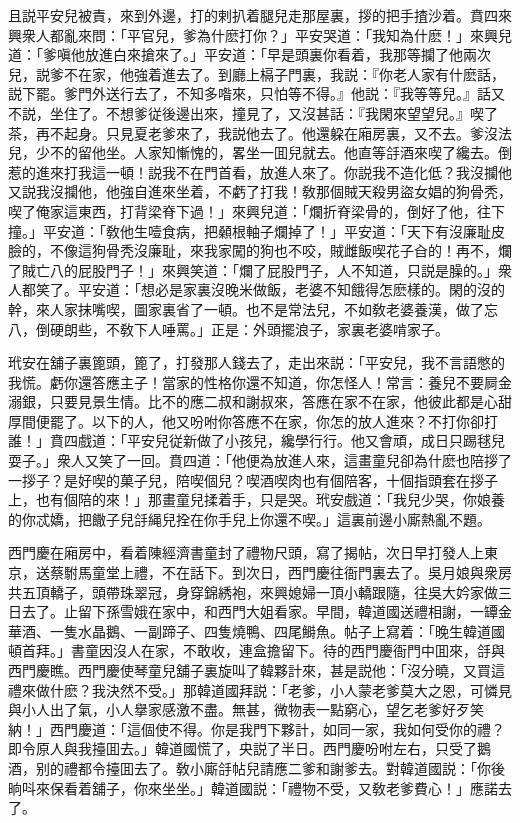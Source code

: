且説平安兒被責，來到外邊，打的剌扒着腿兒走那屋裏，拶的把手揸沙着。賁四來興衆人都亂來問：「平官兒，爹為什麽打你？」平安哭道：「我知為什麽！」來興兒道：「爹嗔他放進白來搶來了。」平安道：「早是頭裏你看着，我那等攔了他兩次兒，説爹不在家，他強着進去了。到廳上槅子門裏，我説：『你老人家有什麽話，説下罷。爹門外送行去了，不知多喒來，只怕等不得。』他説：『我等等兒。』話又不説，坐住了。不想爹従後邊出來，撞見了，又沒甚話：『我閑來望望兒。』喫了茶，再不起身。只見夏老爹來了，我説他去了。他還躱在廂房裏，又不去。爹沒法兒，少不的留他坐。人家知慚愧的，畧坐一囬兒就去。他直等㧱酒來喫了纔去。倒惹的進來打我這一頓！説我不在門首看，放進人來了。你説我不造化低？我沒攔他又説我沒攔他，他強自進來坐着，不虧了打我！敎那個賊天殺男盜女娼的狗骨秃，喫了俺家這東西，打背梁脊下過！」來興兒道：「爛折脊梁骨的，倒好了他，往下撞。」平安道：「敎他生噎食病，把顙根軸子爛掉了！」平安道：「天下有沒廉耻皮臉的，不像這狗骨秃沒廉耻，來我家闖的狗也不咬，賊雌飯喫花子㒲的！再不，爛了賊亡八的屁股門子！」來興笑道：「爛了屁股門子，人不知道，只説是臊的。」衆人都笑了。平安道：「想必是家裏沒晚米做飯，老婆不知餓得怎麽樣的。閑的沒的幹，來人家抹嘴喫，圖家裏省了一頓。也不是常法兒，不如敎老婆養漢，做了忘八，倒硬朗些，不敎下人唾罵。」正是：外頭擺浪子，家裏老婆啃家子。

玳安在舖子裏篦頭，篦了，打發那人錢去了，走出來説：「平安兒，我不言語憋的我慌。虧你還答應主子！當家的性格你還不知道，你怎怪人！常言：養兒不要屙金溺銀，只要見景生情。比不的應二叔和謝叔來，答應在家不在家，他彼此都是心甜厚間便罷了。以下的人，他又吩咐你答應不在家，你怎的放人進來？不打你卻打誰！」賁四戲道：「平安兒従新做了小孩兒，纔學行行。他又會頑，成日只踢毬兒耍子。」衆人又笑了一回。賁四道：「他便為放進人來，這畫童兒卻為什麽也陪拶了一拶子？是好喫的菓子兒，陪喫個兒？喫酒喫肉也有個陪客，十個指頭套在拶子上，也有個陪的來！」那畫童兒揉着手，只是哭。玳安戲道：「我兒少哭，你娘養的你忒嬌，把饊子兒㧱䋲兒拴在你手兒上你還不喫。」這裏前邊小廝熱亂不題。

西門慶在廂房中，看着陳經濟書童封了禮物尺頭，寫了揭帖，次日早打發人上東京，送蔡駙馬童堂上禮，不在話下。到次日，西門慶往衙門裏去了。吳月娘與衆房共五頂轎子，頭帶珠翠冠，身穿錦綉袍，來興媳婦一頂小轎跟隨，往吳大妗家做三日去了。止留下孫雪娥在家中，和西門大姐看家。早間，韓道國送禮相謝，一罈金華酒、一隻水晶鵝、一副蹄子、四隻燒鴨、四尾鰣魚。帖子上寫着：「晚生韓道國頓首拜。」書童因沒人在家，不敢收，連盒擔留下。待的西門慶衙門中囬來，㧱與西門慶瞧。西門慶使琴童兒舖子裏旋叫了韓夥計來，甚是説他：「沒分曉，又買這禮來做什麽？我決然不受。」那韓道國拜説：「老爹，小人蒙老爹莫大之恩，可憐見與小人出了氣，小人擧家感激不盡。無甚，微物表一點窮心，望乞老爹好歹笑納！」西門慶道：「這個使不得。你是我門下夥計，如同一家，我如何受你的禮？即令原人與我擡囬去。」韓道國慌了，央説了半日。西門慶吩咐左右，只受了鵝酒，别的禮都令擡囬去了。敎小廝㧱帖兒請應二爹和謝爹去。對韓道國説：「你後晌呌來保看着舖子，你來坐坐。」韓道國説：「禮物不受，又敎老爹費心！」應諾去了。

